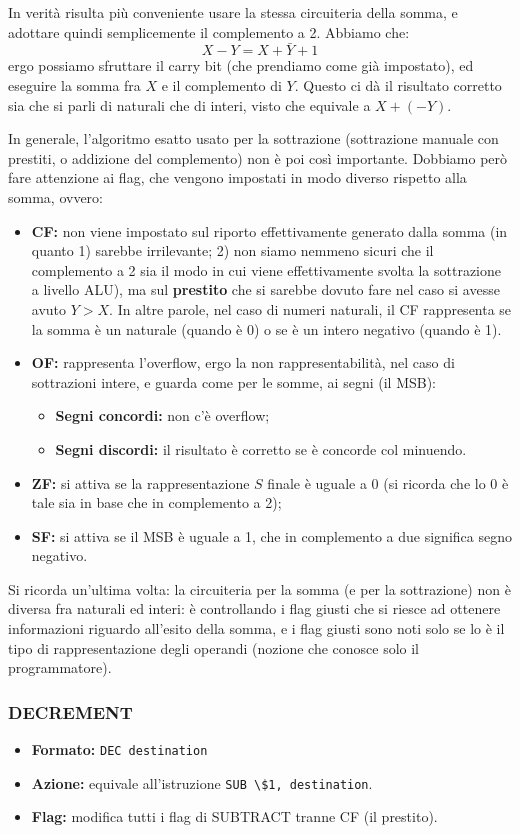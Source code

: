 \documentclass[a4paper,11pt]{article}
\begin{document}
	
In verità risulta più conveniente usare la stessa circuiteria della somma, e adottare quindi semplicemente il complemento a 2.
Abbiamo che:
$$ X - Y = X + \bar{Y} + 1 $$
ergo possiamo sfruttare il carry bit (che prendiamo come già impostato), ed eseguire la somma fra $X$ e il complemento di $Y$.
Questo ci dà il risultato corretto sia che si parli di naturali che di interi, visto che equivale a $X + (-Y)$.

In generale, l'algoritmo esatto usato per la sottrazione (sottrazione manuale con prestiti, o addizione del complemento) non è poi così importante.
Dobbiamo però fare attenzione ai flag, che vengono impostati in modo diverso rispetto alla somma, ovvero:
\begin{itemize}
	\item \textbf{CF:} non viene impostato sul riporto effettivamente generato dalla somma (in quanto 1) sarebbe irrilevante; 2) non siamo nemmeno sicuri che il complemento a 2 sia il modo in cui viene effettivamente svolta la sottrazione a livello ALU), ma sul \textbf{prestito} che si sarebbe dovuto fare nel caso si avesse avuto $Y > X$. In altre parole, nel caso di numeri naturali, il CF rappresenta se la somma è un naturale (quando è 0) o se è un intero negativo (quando è 1).
	\item \textbf{OF:} rappresenta l'overflow, ergo la non rappresentabilità, nel caso di sottrazioni intere, e guarda come per le somme, ai segni (il MSB):
		\begin{itemize}
		\item \textbf{Segni concordi:} non c'è overflow;
		\item \textbf{Segni discordi:} il risultato è corretto se è concorde col minuendo.
		\end{itemize}	
	\item \textbf{ZF:} si attiva se la rappresentazione $S$ finale è uguale a 0 (si ricorda che lo 0 è tale sia in base che in complemento a 2);
	\item \textbf{SF:} si attiva se il MSB è uguale a 1, che in complemento a due significa segno negativo.
\end{itemize}

Si ricorda un'ultima volta: la circuiteria per la somma (e per la sottrazione) non è diversa fra naturali ed interi: è controllando i flag giusti che si riesce ad ottenere informazioni riguardo all'esito della somma, e i flag giusti sono noti solo se lo è il tipo di rappresentazione degli operandi (nozione che conosce solo il programmatore).
\subsubsection{DECREMENT}
\begin{itemize}
	\item \textbf{Formato:} \lstinline|DEC destination|
	\item \textbf{Azione:} equivale all'istruzione \lstinline|SUB \$1, destination|. 
	\item \textbf{Flag:} modifica tutti i flag di SUBTRACT tranne CF (il prestito).
\end{itemize}
\end{document}
